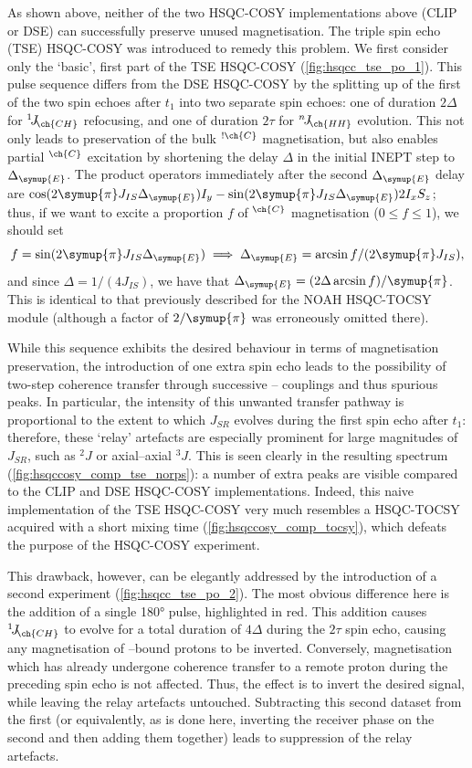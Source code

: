 \documentclass[a4paper,12pt]{article}
\newcommand{\proton}{\ch{^{1}H}}
\newcommand{\carbon}{\ch{^{13}C}}
\newcommand{\DeltaE}{\Delta_{\symup{E}}}
\newcommand{\HH}{\proton{}--\proton{}}
\newcommand{\magn}[1]{\ch{^1H}$^{\ch{#1}}$}
\newcommand{\magnnot}[1]{\ch{^1H}$^{!\ch{#1}}$}
\newcommand{\oneJ}[1]{{}^{1}\!J_{\!\ch{#1}}}
\newcommand{\nJ}[1]{{}^{n}\!J_{\!\ch{#1}}}
\newcommand{\cpi}{\symup{\pi}}
\begin{document}
\begin{refsection}
As shown above, neither of the two HSQC-COSY implementations above (CLIP or DSE) can successfully preserve unused magnetisation.
The triple spin echo (TSE) HSQC-COSY was introduced to remedy this problem.
We first consider only the `basic', first part of the TSE HSQC-COSY (\cref{fig:hsqcc_tse_po_1}).
This pulse sequence differs from the DSE HSQC-COSY by the splitting up of the first of the two spin echoes after $t_1$ into two separate spin echoes: one of duration $2\Delta$ for $\oneJ{CH}$ refocusing, and one of duration $2\tau$ for $\nJ{HH}$ evolution.
This not only leads to preservation of the bulk \magnnot{C} magnetisation, but also enables partial \magn{C} excitation by shortening the delay $\Delta$ in the initial INEPT step to $\DeltaE$.
The product operators immediately after the second $\DeltaE$ delay are $\cos(2\cpi J_{IS} \DeltaE) I_y - \sin(2\cpi J_{IS} \DeltaE) 2I_xS_z$; thus, if we want to excite a proportion $f$ of \magn{C} magnetisation ($0 \leq f \leq 1$), we should set
$$f = \sin(2\cpi J_{IS} \DeltaE) \implies \DeltaE = \arcsin{f}/(2\cpi J_{IS}),$$
and since $\Delta = 1/(4J_{IS})$, we have that $\DeltaE = (2\Delta \arcsin{f}) / \cpi$.
This is identical to that previously described for the NOAH HSQC-TOCSY module\autocite{Yong2021JMR} (although a factor of $2/\cpi$ was erroneously omitted there).

While this sequence exhibits the desired behaviour in terms of magnetisation preservation, the introduction of one extra spin echo leads to the possibility of two-step coherence transfer through successive \HH{} couplings and thus spurious peaks.
In particular, the intensity of this unwanted transfer pathway is proportional to the extent to which $J_{SR}$ evolves during the first spin echo after $t_1$: therefore, these `relay' artefacts are especially prominent for large magnitudes of $J_{SR}$, such as $^2\!J$ or axial--axial $^3\!J$.
This is seen clearly in the resulting spectrum (\cref{fig:hsqccosy_comp_tse_norps}): a number of extra peaks are visible compared to the CLIP and DSE HSQC-COSY implementations.
Indeed, this naive implementation of the TSE HSQC-COSY very much resembles a HSQC-TOCSY acquired with a short mixing time (\cref{fig:hsqccosy_comp_tocsy}), which defeats the purpose of the HSQC-COSY experiment.

This drawback, however, can be elegantly addressed by the introduction of a second experiment (\cref{fig:hsqcc_tse_po_2}).
The most obvious difference here is the addition of a single \carbon{} \ang{180} pulse, highlighted in red.
This addition causes $\oneJ{CH}$ to evolve for a total duration of $4\Delta$ during the $2\tau$ spin echo, causing any magnetisation of \carbon{}--bound protons to be inverted.
Conversely, magnetisation which has already undergone coherence transfer to a remote proton during the preceding spin echo is not affected.
Thus, the effect is to invert the desired signal, while leaving the relay artefacts untouched.
Subtracting this second dataset from the first (or equivalently, as is done here, inverting the receiver phase on the second and then adding them together) leads to suppression of the relay artefacts.


\end{refsection}
\end{document}

